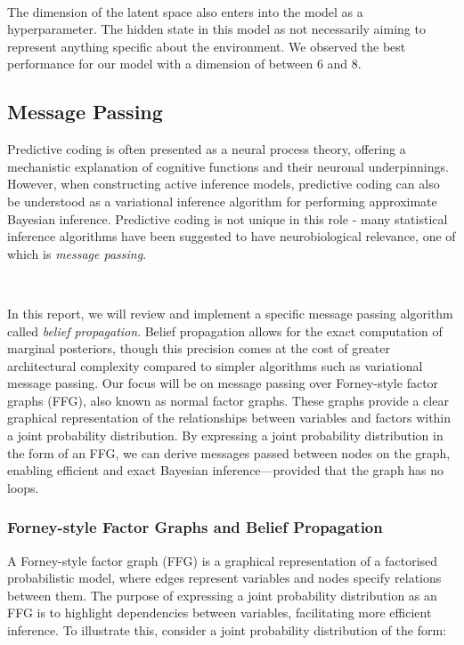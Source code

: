 \documentclass{article}
\begin{document}
\ 

The dimension of the latent space also enters into the model as a hyperparameter. The hidden state in this model as not necessarily aiming to represent anything specific about the environment. We observed the best performance for our model with a dimension of between $6$ and $8$. 

\subsection{Message Passing}

Predictive coding is often presented as a neural process theory, offering a mechanistic explanation of cognitive functions and their neuronal underpinnings. However, when constructing active inference models, predictive coding can also be understood as a variational inference algorithm for performing approximate Bayesian inference. Predictive coding is not unique in this role - many statistical inference algorithms have been suggested to have neurobiological relevance, one of which is \textit{message passing}.

\

In this report, we will review and implement a specific message passing algorithm called \textit{belief propagation}. Belief propagation allows for the exact computation of marginal posteriors, though this precision comes at the cost of greater architectural complexity compared to simpler algorithms such as variational message passing. Our focus will be on message passing over Forney-style factor graphs (FFG), also known as normal factor graphs. These graphs provide a clear graphical representation of the relationships between variables and factors within a joint probability distribution. By expressing a joint probability distribution in the form of an FFG, we can derive messages passed between nodes on the graph, enabling efficient and exact Bayesian inference—provided that the graph has no loops.


\subsubsection{Forney-style Factor Graphs and Belief Propagation}

A Forney-style factor graph (FFG) is a graphical representation of a factorised probabilistic model, where edges represent variables and nodes specify relations between them. The purpose of expressing a joint probability distribution as an FFG is to highlight dependencies between variables, facilitating more efficient inference. To illustrate this, consider a joint probability distribution of the form:
\end{document}
